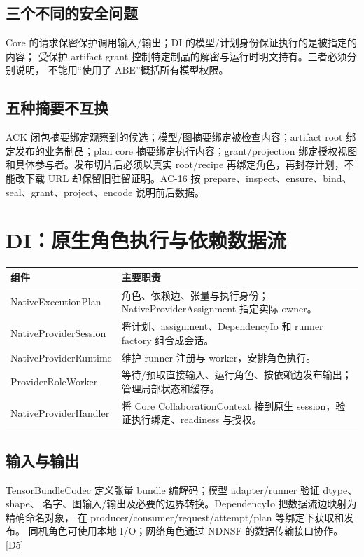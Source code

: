 \subsection{三个不同的安全问题}
Core 的请求保密保护调用输入/输出；DI 的模型/计划身份保证执行的是被指定的内容；
受保护 artifact grant 控制特定制品的解密与运行时明文持有。三者必须分别说明，
不能用“使用了 ABE”概括所有模型权限。



\subsection{五种摘要不互换}
ACK 闭包摘要绑定观察到的候选；模型/图摘要绑定被检查内容；artifact root 绑定发布的业务制品；plan core 摘要绑定执行内容；grant/projection 绑定授权视图和具体参与者。发布切片后必须以真实 root/recipe 再绑定角色，再封存计划，不能改下载 URL 却保留旧驻留证明。AC-16 按 prepare、inspect、ensure、bind、seal、grant、project、encode 说明前后数据。

\newpage

\section{DI：原生角色执行与依赖数据流}
\begin{tabularx}{\linewidth}{@{}p{43mm}X@{}}
\toprule
组件 & 主要职责 \\
\midrule
NativeExecutionPlan & 角色、依赖边、张量与执行身份；NativeProviderAssignment 指定实际 owner。\\
NativeProviderSession & 将计划、assignment、DependencyIo 和 runner factory 组合成会话。\\
NativeProviderRuntime & 维护 runner 注册与 worker，安排角色执行。\\
ProviderRoleWorker & 等待/预取直接输入、运行角色、按依赖边发布输出；管理局部状态和缓存。\\
NativeProviderHandler & 将 Core CollaborationContext 接到原生 session，验证执行绑定、readiness 与授权。\\
\bottomrule
\end{tabularx}

\subsection{输入与输出}
TensorBundleCodec 定义张量 bundle 编解码；模型 adapter/runner 验证 dtype、shape、
名字、图输入/输出及必要的边界转换。DependencyIo 把数据流边映射为精确命名对象，
在 producer/consumer/request/attempt/plan 等绑定下获取和发布。
同机角色可使用本地 I/O；网络角色通过 NDNSF 的数据传输接口协作。[D5]

